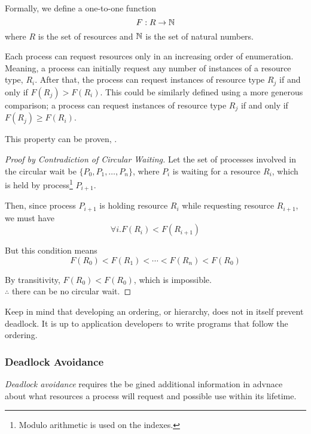 Formally, we define a one-to-one function
\begin{equation*}
F: R \to \operatorname{\mathbb{N}}
\end{equation*}
where $R$ is the set of resources and  $\operatorname{\mathbb{N}}$ is the set of natural numbers.

Each process can request resources only in an increasing order of enumeration.
Meaning, a process can initially request any number of instances of a resource type, $R_{i}$.
After that, the process can request instances of resource type $R_{j}$ if and only if $F(R_{j}) > F(R_{i})$.
This could be similarly defined using a more generous comparison; a process can request instances of resource type $R_{j}$ if and only if $F(R_{j}) \geq F(R_{i})$.

This property can be proven, .

\begin{proof}[Proof by Contradiction of Circular Waiting]\label{proof:Circular_Wait}
  Let the set of processes involved in the circular wait be $\lbrace P_{0}, P_{1}, \ldots, P_{n} \rbrace$, where $P_{i}$ is waiting for a resource $R_{i}$, which is held by process\footnote{Modulo arithmetic is used on the indexes.} $P_{i+1}$.

  Then, since process $P_{i+1}$ is holding resource $R_{i}$ while requesting resource $R_{i+1}$, we must have
  \begin{equation*}
    \forall i. F(R_{i}) < F(R_{i+1})
  \end{equation*}

  But this condition means
  \begin{equation*}
    F(R_{0}) < F(R_{1}) < \cdots < F(R_{n}) < F (R_{0})
  \end{equation*}

  By transitivity, $F(R_{0}) < F(R_{0})$, which is impossible. \\
  $\therefore$ there can be no circular wait.
\end{proof}

\begin{blackbox}
  Keep in mind that developing an ordering, or hierarchy, does not in itself prevent deadlock.
  It is up to application developers to write programs that follow the ordering.
\end{blackbox}

\subsubsection{Deadlock Avoidance}\label{subsubsec:Deadlock_Avoidance}
\begin{definition}\label{def:Deadlock_Avoidance}
  \emph{Deadlock avoidance} requires the  be gined additional information in advnace about what resources a process will request and possible use within its lifetime.
\end{definition}

